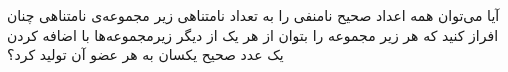 \EXERCISE
آیا می‌توان همه اعداد صحیح نامنفی را به تعداد نامتناهی زیر مجموعه‌ی نامتناهی چنان افراز کنید که هر زیر مجموعه را بتوان از هر یک از دیگر زیرمجموعه‌ها با اضافه کردن یک عدد صحیح یکسان به هر عضو آن تولید کرد؟